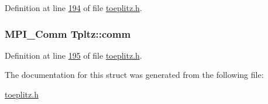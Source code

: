 Definition at line \hyperlink{toeplitz_8h_source_l00194}{194} of file \hyperlink{toeplitz_8h_source}{toeplitz.\-h}.

\hypertarget{structTpltz_ac000d7cb5fa8d9a204a38255e5d00098}{
\subsubsection[{comm}]{\setlength{\rightskip}{0pt plus 5cm}M\-P\-I\-\_\-\-Comm Tpltz\-::comm}}\label{structTpltz_ac000d7cb5fa8d9a204a38255e5d00098}


Definition at line \hyperlink{toeplitz_8h_source_l00195}{195} of file \hyperlink{toeplitz_8h_source}{toeplitz.\-h}.



The documentation for this struct was generated from the following file\-:\begin{DoxyCompactItemize}
\item 
\hyperlink{toeplitz_8h}{toeplitz.\-h}\end{DoxyCompactItemize}
